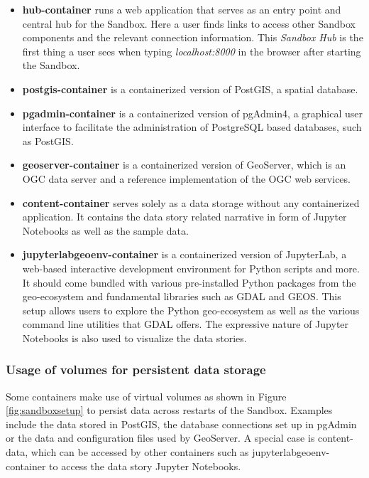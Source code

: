 \documentclass[11pt, a4paper, oneside, parskip=full-]{scrartcl}
\begin{document}
\begin{itemize}
  \item \textbf{hub-container} runs a web application that serves as an entry
  point and central hub for the Sandbox. Here a user finds links to access other
  Sandbox components and the relevant connection information. This \emph{Sandbox
  Hub} is the first thing a user sees when typing \emph{localhost:8000} in the
  browser after starting the Sandbox.
  \item \textbf{postgis-container} is a containerized version of PostGIS, a
  spatial database.
  \item \textbf{pgadmin-container} is a containerized version of pgAdmin4, a
  graphical user interface to facilitate the administration of PostgreSQL based
  databases, such as PostGIS.
  \item \textbf{geoserver-container} is a containerized version of GeoServer,
  which is an OGC data server and a reference implementation of the OGC web
  services.
  \item \textbf{content-container} serves solely as a data storage without any
  containerized application. It contains the data story related narrative in
  form of Jupyter Notebooks as well as the sample data.
  \item \textbf{jupyterlabgeoenv-container} is a containerized version of
  JupyterLab, a web-based interactive development environment for Python scripts
  and more. It should come bundled with various pre-installed Python packages
  from the geo-ecosystem and fundamental libraries such as GDAL and
  GEOS\cite{geos}. This setup allows users to explore the Python geo-ecosystem
  as well as the various command line utilities that GDAL offers. The expressive
  nature of Jupyter Notebooks is also used to visualize the data stories.
\end{itemize}

\subsubsection*{Usage of volumes for persistent data storage}
Some containers make use of virtual volumes as shown in Figure
\ref{fig:sandboxsetup} to persist data across restarts of the Sandbox. Examples
include the data stored in PostGIS, the database connections set up in pgAdmin
or the data and configuration files used by GeoServer. A special case is
content-data, which can be accessed by other containers such as
jupyterlabgeoenv-container to access the data story Jupyter Notebooks.
\end{document}
